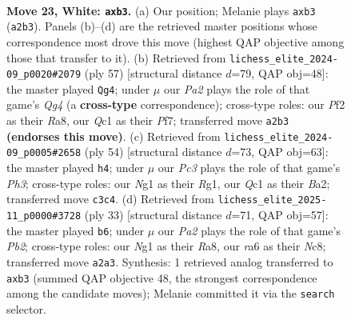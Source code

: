 \documentclass[11pt]{article}
\begin{document}
\begin{figure}[p]
\label{fig:thought-m42}
\end{figure}

\clearpage

\begin{figure}[p]\centering
\begin{subfigure}{0.46\textwidth}\centering
\resizebox{\linewidth}{!}{%
\newchessgame
\chessboard[
  setfen={2r3k1/1bqn1p1p/r4Bp1/pp1Pp3/4P3/1pP3P1/P3KP1P/R1Q3NR w - - 0 23},
  showmover=false,
  pgfstyle=straightmove, color=movearrow, markmove={a2-b3}
]}
\caption{}
\end{subfigure}\hfill
\begin{subfigure}{0.46\textwidth}\centering
\resizebox{\linewidth}{!}{%
\newchessgame
\chessboard[
  setfen={r7/5prk/b3p3/Pp1p1pq1/1Q1P3p/P4RP1/2P1BP1P/1R4K1 b - - 1 29},
  showmover=false,
  pgfstyle=straightmove, color=movearrow, markmove={g5-g4}
]}
\caption{}
\end{subfigure}
\\[4pt]
\begin{subfigure}{0.46\textwidth}\centering
\resizebox{\linewidth}{!}{%
\newchessgame
\chessboard[
  setfen={r4r2/1p1b1p1k/2p4q/p2p1Pp1/P3Pp2/3P1R1P/BPP2Q2/6RK w - - 0 28},
  showmover=false,
  pgfstyle=straightmove, color=movearrow, markmove={h3-h4}
]}
\caption{}
\end{subfigure}\hfill
\begin{subfigure}{0.46\textwidth}\centering
\resizebox{\linewidth}{!}{%
\newchessgame
\chessboard[
  setfen={r1nqr1k1/ppp2pbp/P5p1/2pP4/5P2/2NQ3P/1P2BPP1/R4RK1 b - - 0 17},
  showmover=false,
  pgfstyle=straightmove, color=movearrow, markmove={b7-b6}
]}
\caption{}
\end{subfigure}
\caption{\textbf{Move 23, White: \texttt{axb3}.} (a) Our position; Melanie plays \texttt{axb3} (\texttt{a2b3}). Panels (b)--(d) are the retrieved master positions whose correspondence most drove this move (highest QAP objective among those that transfer to it). (b) Retrieved from \texttt{lichess\_elite\_2024-09\_p0020\#2079} (ply 57) [structural distance $d$=79, QAP obj=48]: the master played \texttt{Qg4}; under $\mu$ our \emph{Pa2} plays the role of that game's \emph{Qg4} (a \textbf{cross-type} correspondence); cross-type roles: our \emph{P}f2 as their \emph{R}a8, our \emph{Q}c1 as their \emph{P}f7; transferred move \texttt{a2b3} \textbf{(endorses this move)}. (c) Retrieved from \texttt{lichess\_elite\_2024-09\_p0005\#2658} (ply 54) [structural distance $d$=73, QAP obj=63]: the master played \texttt{h4}; under $\mu$ our \emph{Pc3} plays the role of that game's \emph{Ph3}; cross-type roles: our \emph{N}g1 as their \emph{R}g1, our \emph{Q}c1 as their \emph{B}a2; transferred move \texttt{c3c4}. (d) Retrieved from \texttt{lichess\_elite\_2025-11\_p0000\#3728} (ply 33) [structural distance $d$=71, QAP obj=57]: the master played \texttt{b6}; under $\mu$ our \emph{Pa2} plays the role of that game's \emph{Pb2}; cross-type roles: our \emph{N}g1 as their \emph{R}a8, our \emph{r}a6 as their \emph{N}c8; transferred move \texttt{a2a3}. Synthesis: 1 retrieved analog transferred to \texttt{axb3} (summed QAP objective 48, the strongest correspondence among the candidate moves); Melanie committed it via the \texttt{search} selector.}

\end{figure}
\end{document}
